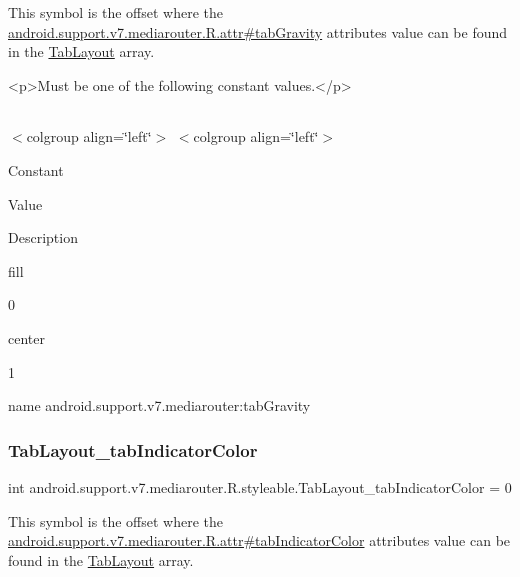 This symbol is the offset where the \hyperlink{classandroid_1_1support_1_1v7_1_1mediarouter_1_1R_1_1attr_af2a23c12df456b47f80096e89092fabd}{android.\+support.\+v7.\+mediarouter.\+R.\+attr\#tab\+Gravity} attribute\textquotesingle{}s value can be found in the \hyperlink{classandroid_1_1support_1_1v7_1_1mediarouter_1_1R_1_1styleable_a94de1350e0a902b4a974d775f2f4f25e}{Tab\+Layout} array.

\begin{DoxyVerb}      <p>Must be one of the following constant values.</p>
\end{DoxyVerb}
 \tabulinesep=1mm
\begin{longtabu} spread 0pt [c]{*{0}{|X[-1]}|}
\hline
\end{longtabu}
$<$colgroup align=\char`\"{}left\char`\"{}$>$ $<$colgroup align=\char`\"{}left\char`\"{}$>$ 

Constant

Value

Description 

{\ttfamily fill}

0

{\ttfamily center}

1

name android.\+support.\+v7.\+mediarouter\+:tab\+Gravity \mbox{\label{classandroid_1_1support_1_1v7_1_1mediarouter_1_1R_1_1styleable_afc512c65c0fbbdef2ba01c921bf019e7}} 
\subsubsection{\texorpdfstring{Tab\+Layout\+\_\+tab\+Indicator\+Color}{TabLayout\_tabIndicatorColor}}
{\footnotesize\ttfamily int android.\+support.\+v7.\+mediarouter.\+R.\+styleable.\+Tab\+Layout\+\_\+tab\+Indicator\+Color = 0\hspace{0.3cm}{\ttfamily [static]}}

This symbol is the offset where the \hyperlink{classandroid_1_1support_1_1v7_1_1mediarouter_1_1R_1_1attr_a5fa8ac9760622b42329186cf71b2cee1}{android.\+support.\+v7.\+mediarouter.\+R.\+attr\#tab\+Indicator\+Color} attribute\textquotesingle{}s value can be found in the \hyperlink{classandroid_1_1support_1_1v7_1_1mediarouter_1_1R_1_1styleable_a94de1350e0a902b4a974d775f2f4f25e}{Tab\+Layout} array.

